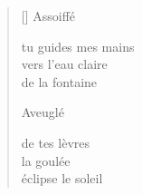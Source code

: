 \documentclass[11pt,a4paper]{article}
\begin{document}
\thispagestyle{empty}


\settowidth{\versewidth}{fait pâlir le soleil}

\bigskip

\begin{verse}[\versewidth]
  Assoiffé

  tu guides mes mains \\
  vers l'eau claire \\
  de la fontaine

  Aveuglé

  de tes lèvres \\
  la goulée \\
  éclipse le soleil
\end{verse}
\end{document}
